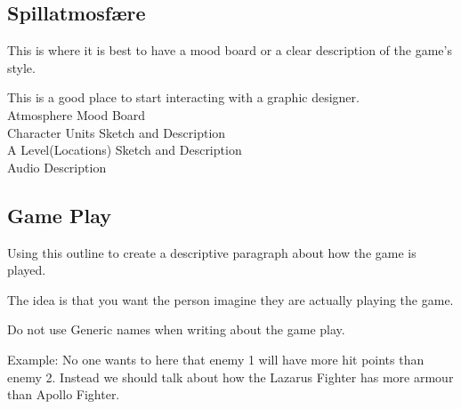 \subsection{Spillatmosfære}

This is where it is best to have a mood board or a clear description of the game’s style. 

This is a good place to start interacting with a graphic designer.\\

Atmosphere Mood Board\\
Character  Units Sketch and Description\\
A Level(Locations) Sketch and Description\\
Audio Description

\subsection{Game Play}

Using this outline to create a descriptive paragraph about how the game is played. 

The idea is that you want the person imagine they are actually playing the game.

Do not use Generic names when writing about the game play. 

Example: No one wants to here that enemy 1 will have more hit points than enemy 2. Instead we should talk about how the Lazarus Fighter has more armour than Apollo Fighter.

